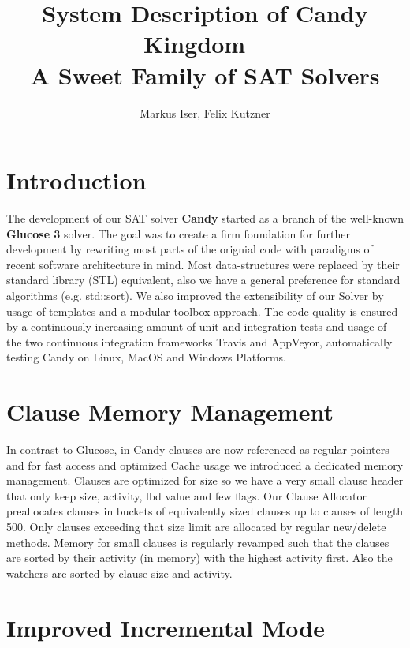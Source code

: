 \documentclass{llncs}
\title{System Description of Candy Kingdom --\\ A Sweet Family of SAT Solvers}
\author{Markus Iser, Felix Kutzner}
\institute{
  Karlsruhe Institute of Technology (KIT), Germany\\
  \url{{markus.iser, felix.kutzner}@kit.edu}
}
\begin{document}
\maketitle

\begin{abstract}

\end{abstract}

\section{Introduction}

The development of our SAT solver \textbf{Candy} started as a branch of the well-known \textbf{Glucose 3} solver. The goal was to create a firm foundation for further development by rewriting most parts of the orignial code with paradigms of recent software architecture in mind. Most data-structures were replaced by their standard library (STL) equivalent, also we have a general preference for standard algorithms (e.g. std::sort). We also improved the extensibility of our Solver by usage of templates and a modular toolbox approach. The code quality is ensured by a continuously increasing amount of unit and integration tests and usage of the two continuous integration frameworks Travis and AppVeyor, automatically testing Candy on Linux, MacOS and Windows Platforms. 

\section{Clause Memory Management}
\label{sec:clauses}

In contrast to Glucose, in Candy clauses are now referenced as regular pointers and for fast access and optimized Cache usage we introduced a dedicated memory management. Clauses are optimized for size so we have a very small clause header that only keep size, activity, lbd value and few flags. Our Clause Allocator preallocates clauses in buckets of equivalently sized clauses up to clauses of length 500. Only clauses exceeding that size limit are allocated by regular new/delete methods. Memory for small clauses is regularly revamped such that the clauses are sorted by their activity (in memory) with the highest activity first. Also the watchers are sorted by clause size and activity. 

\section{Improved Incremental Mode}
\end{document}
